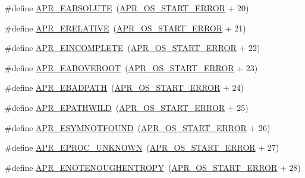 \begin{DoxyCompactItemize}
\#define \hyperlink{group__APR__Error_gafd1ffc5bf2bf215ad048780408913d0e}{A\+P\+R\+\_\+\+E\+A\+B\+S\+O\+L\+U\+TE}~(\hyperlink{group__apr__errno_ga191894048b7bd0cca3cf0bdff1eb695b}{A\+P\+R\+\_\+\+O\+S\+\_\+\+S\+T\+A\+R\+T\+\_\+\+E\+R\+R\+OR} + 20)
\item 
\#define \hyperlink{group__APR__Error_gae4688dfa866265b9ec3623689c23923b}{A\+P\+R\+\_\+\+E\+R\+E\+L\+A\+T\+I\+VE}~(\hyperlink{group__apr__errno_ga191894048b7bd0cca3cf0bdff1eb695b}{A\+P\+R\+\_\+\+O\+S\+\_\+\+S\+T\+A\+R\+T\+\_\+\+E\+R\+R\+OR} + 21)
\item 
\#define \hyperlink{group__APR__Error_gab4357bcbdc2922183e0594865b59ce58}{A\+P\+R\+\_\+\+E\+I\+N\+C\+O\+M\+P\+L\+E\+TE}~(\hyperlink{group__apr__errno_ga191894048b7bd0cca3cf0bdff1eb695b}{A\+P\+R\+\_\+\+O\+S\+\_\+\+S\+T\+A\+R\+T\+\_\+\+E\+R\+R\+OR} + 22)
\item 
\#define \hyperlink{group__APR__Error_ga4828cc04f97dc7bed691456adf7c073e}{A\+P\+R\+\_\+\+E\+A\+B\+O\+V\+E\+R\+O\+OT}~(\hyperlink{group__apr__errno_ga191894048b7bd0cca3cf0bdff1eb695b}{A\+P\+R\+\_\+\+O\+S\+\_\+\+S\+T\+A\+R\+T\+\_\+\+E\+R\+R\+OR} + 23)
\item 
\#define \hyperlink{group__APR__Error_ga1731292eb3e3cdc801d3bf0b09cd8da7}{A\+P\+R\+\_\+\+E\+B\+A\+D\+P\+A\+TH}~(\hyperlink{group__apr__errno_ga191894048b7bd0cca3cf0bdff1eb695b}{A\+P\+R\+\_\+\+O\+S\+\_\+\+S\+T\+A\+R\+T\+\_\+\+E\+R\+R\+OR} + 24)
\item 
\#define \hyperlink{group__APR__Error_ga01d0fb965051103b5c8f15a43ad2c767}{A\+P\+R\+\_\+\+E\+P\+A\+T\+H\+W\+I\+LD}~(\hyperlink{group__apr__errno_ga191894048b7bd0cca3cf0bdff1eb695b}{A\+P\+R\+\_\+\+O\+S\+\_\+\+S\+T\+A\+R\+T\+\_\+\+E\+R\+R\+OR} + 25)
\item 
\#define \hyperlink{group__APR__Error_ga8d96410fc32408160e1e85e2e96402fa}{A\+P\+R\+\_\+\+E\+S\+Y\+M\+N\+O\+T\+F\+O\+U\+ND}~(\hyperlink{group__apr__errno_ga191894048b7bd0cca3cf0bdff1eb695b}{A\+P\+R\+\_\+\+O\+S\+\_\+\+S\+T\+A\+R\+T\+\_\+\+E\+R\+R\+OR} + 26)
\item 
\#define \hyperlink{group__APR__Error_ga01b21dc62b410707f44641d3cea3e6ed}{A\+P\+R\+\_\+\+E\+P\+R\+O\+C\+\_\+\+U\+N\+K\+N\+O\+WN}~(\hyperlink{group__apr__errno_ga191894048b7bd0cca3cf0bdff1eb695b}{A\+P\+R\+\_\+\+O\+S\+\_\+\+S\+T\+A\+R\+T\+\_\+\+E\+R\+R\+OR} + 27)
\item 
\#define \hyperlink{group__APR__Error_gaaee9e4e763844197e3750bb66ff75cd0}{A\+P\+R\+\_\+\+E\+N\+O\+T\+E\+N\+O\+U\+G\+H\+E\+N\+T\+R\+O\+PY}~(\hyperlink{group__apr__errno_ga191894048b7bd0cca3cf0bdff1eb695b}{A\+P\+R\+\_\+\+O\+S\+\_\+\+S\+T\+A\+R\+T\+\_\+\+E\+R\+R\+OR} + 28)

\end{DoxyCompactItemize}
